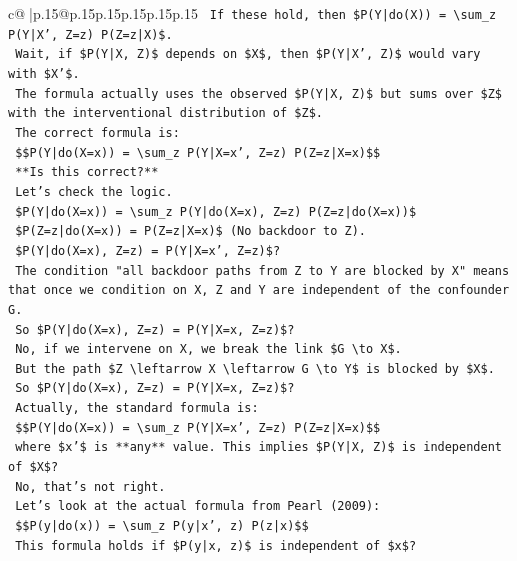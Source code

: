 \documentclass{article}
\begin{document}
{\begin{supertabular}{c@{$\;$}|p{.15\linewidth}@{}p{.15\linewidth}p{.15\linewidth}p{.15\linewidth}p{.15\linewidth}p{.15\linewidth}}
{{{\texttt{   If these hold, then \$P(Y|do(X)) = \textbackslash{}sum\_z P(Y|X', Z=z) P(Z=z|X)\$.} \\
\texttt{   Wait, if \$P(Y|X, Z)\$ depends on \$X\$, then \$P(Y|X', Z)\$ would vary with \$X'\$.} \\
\texttt{   The formula actually uses the observed \$P(Y|X, Z)\$ but sums over \$Z\$ with the interventional distribution of \$Z\$.} \\
\texttt{   The correct formula is:} \\
\texttt{   \$\$P(Y|do(X=x)) = \textbackslash{}sum\_z P(Y|X=x', Z=z) P(Z=z|X=x)\$\$} \\
\texttt{   **Is this correct?**} \\
\texttt{   Let's check the logic.} \\
\texttt{   \$P(Y|do(X=x)) = \textbackslash{}sum\_z P(Y|do(X=x), Z=z) P(Z=z|do(X=x))\$} \\
\texttt{   \$P(Z=z|do(X=x)) = P(Z=z|X=x)\$ (No backdoor to Z).} \\
\texttt{   \$P(Y|do(X=x), Z=z) = P(Y|X=x', Z=z)\$?} \\
\texttt{   The condition "all backdoor paths from Z to Y are blocked by X" means that once we condition on X, Z and Y are independent of the confounder G.} \\
\texttt{   So \$P(Y|do(X=x), Z=z) = P(Y|X=x, Z=z)\$?} \\
\texttt{   No, if we intervene on X, we break the link \$G \textbackslash{}to X\$.} \\
\texttt{   But the path \$Z \textbackslash{}leftarrow X \textbackslash{}leftarrow G \textbackslash{}to Y\$ is blocked by \$X\$.} \\
\texttt{   So \$P(Y|do(X=x), Z=z) = P(Y|X=x, Z=z)\$?} \\
\texttt{   Actually, the standard formula is:} \\
\texttt{   \$\$P(Y|do(X=x)) = \textbackslash{}sum\_z P(Y|X=x', Z=z) P(Z=z|X=x)\$\$} \\
\texttt{   where \$x'\$ is **any** value. This implies \$P(Y|X, Z)\$ is independent of \$X\$?} \\
\texttt{   No, that's not right.} \\
\texttt{   Let's look at the actual formula from Pearl (2009):} \\
\texttt{   \$\$P(y|do(x)) = \textbackslash{}sum\_z P(y|x', z) P(z|x)\$\$} \\
\texttt{   This formula holds if \$P(y|x, z)\$ is independent of \$x\$?} \\
}}}
\end{supertabular}}
\end{document}
